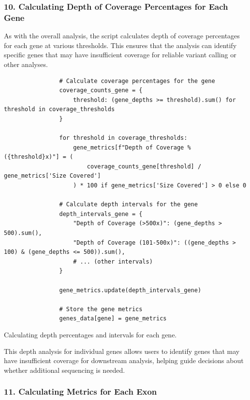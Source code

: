\subsubsection{10. Calculating Depth of Coverage Percentages for Each Gene}

As with the overall analysis, the script calculates depth of coverage percentages for each gene at various thresholds. This ensures that the analysis can identify specific genes that may have insufficient coverage for reliable variant calling or other analyses.

\begin{longlisting}
\begin{verbatim}
                # Calculate coverage percentages for the gene
                coverage_counts_gene = {
                    threshold: (gene_depths >= threshold).sum() for threshold in coverage_thresholds
                }

                for threshold in coverage_thresholds:
                    gene_metrics[f"Depth of Coverage % ({threshold}x)"] = (
                        coverage_counts_gene[threshold] / gene_metrics['Size Covered']
                    ) * 100 if gene_metrics['Size Covered'] > 0 else 0

                # Calculate depth intervals for the gene
                depth_intervals_gene = {
                    "Depth of Coverage (>500x)": (gene_depths > 500).sum(),
                    "Depth of Coverage (101-500x)": ((gene_depths > 100) & (gene_depths <= 500)).sum(),
                    # ... (other intervals)
                }

                gene_metrics.update(depth_intervals_gene)

                # Store the gene metrics
                genes_data[gene] = gene_metrics
\end{verbatim}
\caption{Calculating depth percentages and intervals for each gene.}
\label{lbl:metrics_gene_coverage}
\end{longlisting}

This depth analysis for individual genes allows users to identify genes that may have insufficient coverage for downstream analysis, helping guide decisions about whether additional sequencing is needed.

\subsubsection{11. Calculating Metrics for Each Exon}

